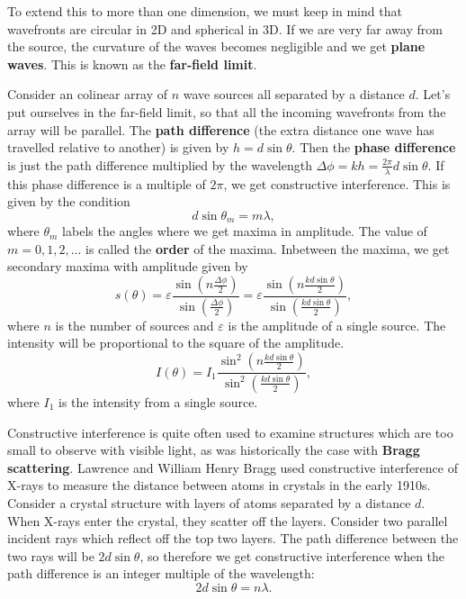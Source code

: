 \documentclass[../classical_mechanics.tex]{subfiles}
\begin{document}
        To extend this to more than one dimension, we must keep in mind that wavefronts are circular in 2D and spherical in 3D.
        If we are very far away from the source, the curvature of the waves becomes negligible and we get \textbf{plane waves}.
        This is known as the \textbf{far-field limit}.

        Consider an colinear array of $n$ wave sources all separated by a distance $d$.
        Let's put ourselves in the far-field limit, so that all the incoming wavefronts from the array will be parallel.
        The \textbf{path difference} (the extra distance one wave has travelled relative to another) is given by $h=d\sin\theta$.
        Then the \textbf{phase difference} is just the path difference multiplied by the wavelength $\Delta\phi=kh=\frac{2\pi}{\lambda}d\sin\theta$.
        If this phase difference is a multiple of $2\pi$, we get constructive interference.
        This is given by the condition
        \begin{equation}
            d\sin\theta_m=m\lambda,
        \end{equation}
        where $\theta_m$ labels the angles where we get maxima in amplitude.
        The value of $m=0,1,2,...$ is called the \textbf{order} of the maxima.
        Inbetween the maxima, we get secondary maxima with amplitude given by
        \begin{equation}
            s(\theta)=\varepsilon\frac{\sin\left(n\frac{\Delta\phi}{2}\right)}{\sin\left(\frac{\Delta\phi}{2}\right)}=\varepsilon\frac{\sin\left(n\frac{kd\sin\theta}{2}\right)}{\sin\left(\frac{kd\sin\theta}{2}\right)},
        \end{equation}
        where $n$ is the number of sources and $\varepsilon$ is the amplitude of a single source.
        The intensity will be proportional to the square of the amplitude.
        \begin{equation}
            I(\theta)=I_1\frac{\sin^2\left(n\frac{kd\sin\theta}{2}\right)}{\sin^2\left(\frac{kd\sin\theta}{2}\right)},
        \end{equation}
        where $I_1$ is the intensity from a single source.

        Constructive interference is quite often used to examine structures which are too small to observe with visible light, as was historically the case with \textbf{Bragg scattering}.
        Lawrence and William Henry Bragg used constructive interference of X-rays to measure the distance between atoms in crystals in the early 1910s.
        Consider a crystal structure with layers of atoms separated by a distance $d$.
        When X-rays enter the crystal, they scatter off the layers.
        Consider two parallel incident rays which reflect off the top two layers.
        The path difference between the two rays will be $2d\sin\theta$, so therefore we get constructive interference when the path difference is an integer multiple of the wavelength:
        \begin{equation}
            2d\sin\theta=n\lambda.
        \end{equation}
\end{document}
